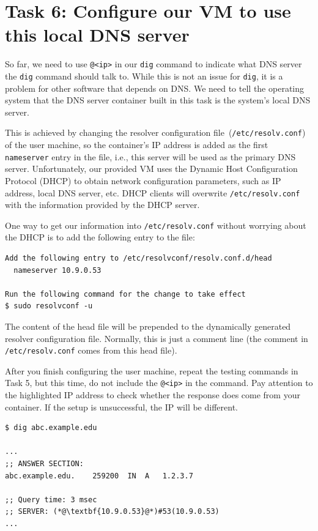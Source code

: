 \section{Task 6: Configure our VM to use this local DNS server} 

So far, we need to use \texttt{@<ip>} in our \texttt{dig} command
to indicate what DNS server the \texttt{dig} command should talk to. While this 
is not an issue for \texttt{dig}, it is a problem for other software that 
depends on DNS. We need to tell the operating system that the 
DNS server container built in this task is the system's 
local DNS server. 

This is achieved by changing
the resolver configuration file~(\texttt{/etc/resolv.conf}) of the user machine,
so the container's IP address is added as the first \texttt{nameserver} entry in the file, i.e.,
this server will be used as the primary DNS server.
Unfortunately, our provided VM uses the Dynamic Host Configuration Protocol (DHCP) to obtain
network configuration parameters, such as IP address, local DNS server, etc.
DHCP clients will overwrite \texttt{/etc/resolv.conf} with the information
provided by the DHCP server.

One way to get our information into \texttt{/etc/resolv.conf} without worrying about
the DHCP is to add the following entry to the 
file:

\begin{lstlisting}
Add the following entry to /etc/resolvconf/resolv.conf.d/head
  nameserver 10.9.0.53

Run the following command for the change to take effect
$ sudo resolvconf -u
\end{lstlisting}

The content of the head file will be prepended to the dynamically generated resolver
configuration file. Normally, this is just a comment line (the comment in
\texttt{/etc/resolv.conf} comes from this head file).


After you finish configuring the user machine, repeat 
the testing commands in Task 5, but this time, do not 
include the \texttt{@<ip>} in the command. Pay attention to 
the highlighted IP address to check whether the response does 
come from your container. If the setup is unsuccessful,
the IP will be different.

\begin{lstlisting}
$ dig abc.example.edu

...
;; ANSWER SECTION:
abc.example.edu.	259200	IN	A	1.2.3.7

;; Query time: 3 msec
;; SERVER: (*@\textbf{10.9.0.53}@*)#53(10.9.0.53)
...
\end{lstlisting}
 

